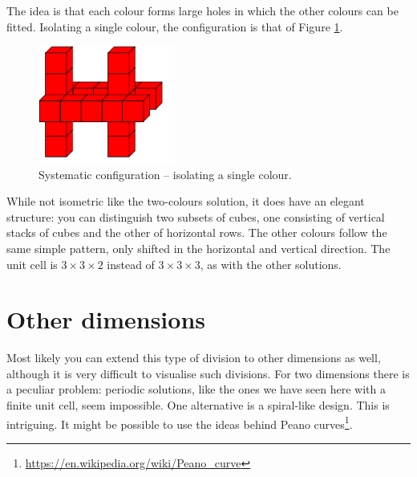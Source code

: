 \documentclass[onecolumn]{article}
\begin{document}
The idea is that each colour forms large holes in which the other colours can be fitted.
Isolating a single colour, the configuration is that of Figure \ref{systematic_configuration}.

\begin{figure}
\center
\caption{Systematic configuration -- isolating a single colour.}
\label{systematic_configuration}
\includegraphics[width=0.4\textwidth]{systematic_configuration.pdf}
\end{figure}

While not isometric like the two-colours solution, it does have an
elegant structure: you can distinguish two subsets of cubes, one
consisting of vertical stacks of cubes and the other of horizontal
rows. The other colours follow the same simple pattern, only shifted
in the horizontal and vertical direction. The unit cell is $3 \times 3 \times 2$
instead of $3 \times 3 \times 3$, as with the other solutions.

\section*{Other dimensions}
Most likely you can extend this type of division to other dimensions as well,
although it is very difficult to visualise such divisions. For two dimensions
there is a peculiar problem: periodic solutions, like the
ones we have seen here with a finite unit cell, seem impossible. One alternative
is a spiral-like design. This is intriguing. It might be possible to use the
ideas behind Peano curves\footnote{\url{https://en.wikipedia.org/wiki/Peano_curve}}.
\end{document}
